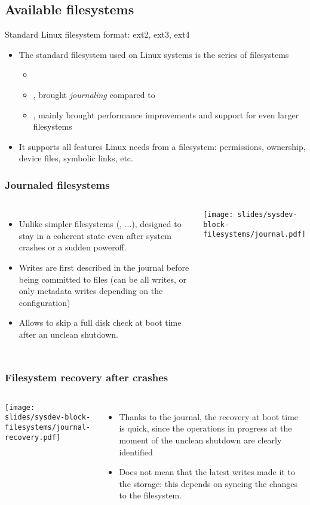 \subsection{Available filesystems}

\begin{frame}{Standard Linux filesystem format: ext2, ext3, ext4}
  \begin{itemize}
  \item The standard filesystem used on Linux systems is the series of
     filesystems
    \begin{itemize}
    \item {}
    \item {}, brought {\em journaling} compared to 
    \item {}, mainly brought performance improvements and
      support for even larger filesystems
    \end{itemize}
  \item It supports all features Linux needs from a filesystem:
    permissions, ownership, device files, symbolic links, etc.
  \end{itemize}
\end{frame}

\begin{frame}
  \frametitle{Journaled filesystems}
  \begin{columns}
    \begin{itemize}
    \item Unlike simpler filesystems (, ...),
      designed to stay in a coherent state even after system
      crashes or a sudden poweroff.
    \item Writes are first described in the journal before being
      committed to files (can be all writes, or only metadata writes
      depending on the configuration)
    \item Allows to skip a full disk check at boot time after an
      unclean shutdown.
    \end{itemize}
    \texttt{[image: slides/sysdev-block-filesystems/journal.pdf]}
  \end{columns}
\end{frame}

\begin{frame}
  \frametitle{Filesystem recovery after crashes}
  \begin{columns}
    \texttt{[image: slides/sysdev-block-filesystems/journal-recovery.pdf]}
    \begin{itemize}
    \item Thanks to the journal, the recovery at boot time is quick,
      since the operations in progress at the moment of the unclean
      shutdown are clearly identified
    \item Does not mean that the latest writes made it to the storage:
      this depends on syncing the changes to the filesystem.
    \end{itemize}
  \end{columns}
\end{frame}

